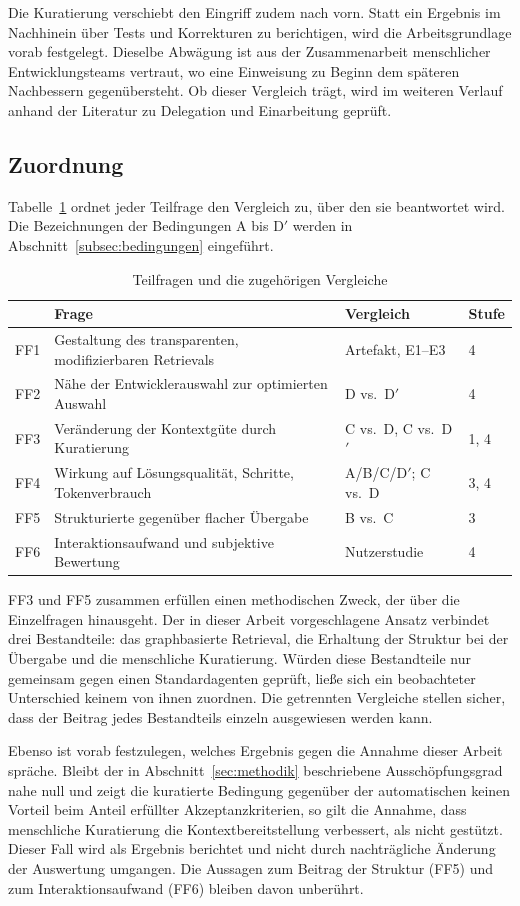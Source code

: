 Die Kuratierung verschiebt den Eingriff zudem nach vorn. Statt ein Ergebnis im Nachhinein über Tests und Korrekturen zu berichtigen, wird die Arbeitsgrundlage vorab festgelegt. Dieselbe Abwägung ist aus der Zusammenarbeit menschlicher Entwicklungsteams vertraut, wo eine Einweisung zu Beginn dem späteren Nachbessern gegenübersteht. Ob dieser Vergleich trägt, wird im weiteren Verlauf anhand der Literatur zu Delegation und Einarbeitung geprüft.

\subsection{Zuordnung}

Tabelle~\ref{tab:ff} ordnet jeder Teilfrage den Vergleich zu, über den sie beantwortet wird. Die Bezeichnungen der Bedingungen A bis D$'$ werden in Abschnitt~\ref{subsec:bedingungen} eingeführt.

\begin{table}[htbp]
  \centering
  \small
  \begin{tabularx}{\textwidth}{@{}lXll@{}}
    \toprule
    & Frage & Vergleich & Stufe \\
    \midrule
    FF1 & Gestaltung des transparenten, modifizierbaren Retrievals & Artefakt, E1--E3 & 4 \\
    FF2 & Nähe der Entwicklerauswahl zur optimierten Auswahl & D vs.\ D$'$ & 4 \\
    FF3 & Veränderung der Kontextgüte durch Kuratierung & C vs.\ D, C vs.\ D$'$ & 1, 4 \\
    FF4 & Wirkung auf Lösungsqualität, Schritte, Tokenverbrauch & A/B/C/D$'$; C vs.\ D & 3, 4 \\
    FF5 & Strukturierte gegenüber flacher Übergabe & B vs.\ C & 3 \\
    FF6 & Interaktionsaufwand und subjektive Bewertung & Nutzerstudie & 4 \\
    \bottomrule
  \end{tabularx}
  \caption{Teilfragen und die zugehörigen Vergleiche}
  \label{tab:ff}
\end{table}

FF3 und FF5 zusammen erfüllen einen methodischen Zweck, der über die Einzelfragen hinausgeht. Der in dieser Arbeit vorgeschlagene Ansatz verbindet drei Bestandteile: das graphbasierte Retrieval, die Erhaltung der Struktur bei der Übergabe und die menschliche Kuratierung. Würden diese Bestandteile nur gemeinsam gegen einen Standardagenten geprüft, ließe sich ein beobachteter Unterschied keinem von ihnen zuordnen. Die getrennten Vergleiche stellen sicher, dass der Beitrag jedes Bestandteils einzeln ausgewiesen werden kann.

Ebenso ist vorab festzulegen, welches Ergebnis gegen die Annahme dieser Arbeit spräche. Bleibt der in Abschnitt~\ref{sec:methodik} beschriebene Ausschöpfungsgrad nahe null und zeigt die kuratierte Bedingung gegenüber der automatischen keinen Vorteil beim Anteil erfüllter Akzeptanzkriterien, so gilt die Annahme, dass menschliche Kuratierung die Kontextbereitstellung verbessert, als nicht gestützt. Dieser Fall wird als Ergebnis berichtet und nicht durch nachträgliche Änderung der Auswertung umgangen. Die Aussagen zum Beitrag der Struktur (FF5) und zum Interaktionsaufwand (FF6) bleiben davon unberührt.
